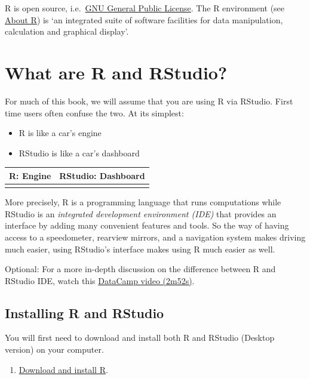 \documentclass[
]{book}
\providecommand{\tightlist}{%
  \setlength{\itemsep}{0pt}\setlength{\parskip}{0pt}}
\begin{document}
R is open source, i.e.~\href{http://en.wikipedia.org/wiki/GNU_General_Public_License}{GNU General Public License}. The R environment (see \href{http://www.r-project.org/about.html}{About R}) is `an integrated suite of software facilities for data manipulation, calculation and graphical display'.

\hypertarget{what-are-r-and-rstudio}{%
\section{What are R and RStudio?}\label{what-are-r-and-rstudio}}

For much of this book, we will assume that you are using R via RStudio. First time users often confuse the two. At its simplest:

\begin{itemize}
\tightlist
\item
  R is like a car's engine
\item
  RStudio is like a car's dashboard
\end{itemize}

\begin{longtable}[]{@{}cc@{}}
\toprule
R: Engine & RStudio: Dashboard\tabularnewline
\midrule
\endhead
&\tabularnewline
\bottomrule
\end{longtable}

More precisely, R is a programming language that runs computations while RStudio is an \emph{integrated development environment (IDE)} that provides an interface by adding many convenient features and tools. So the way of having access to a speedometer, rearview mirrors, and a navigation system makes driving much easier, using RStudio's interface makes using R much easier as well.

Optional: For a more in-depth discussion on the difference between R and RStudio IDE, watch this \href{https://campus.datacamp.com/courses/working-with-the-rstudio-ide-part-1/orientation?ex=1}{DataCamp video (2m52s)}.

\hypertarget{installing-r-and-rstudio}{%
\subsection{Installing R and RStudio}\label{installing-r-and-rstudio}}

You will first need to download and install both R and RStudio (Desktop version) on your computer.

\begin{enumerate}
\def\labelenumi{\arabic{enumi}.}
\tightlist
\item
  \href{https://cran.r-project.org/}{Download and install R}.
\end{enumerate}
\end{document}
